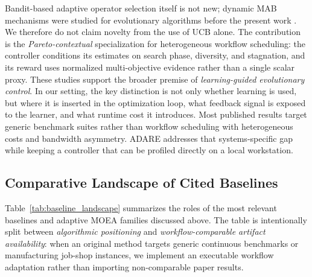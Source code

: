 \documentclass[preprint,12pt]{elsarticle}
\begin{document}
Bandit-based adaptive operator selection itself is not new; dynamic MAB mechanisms were studied for evolutionary algorithms before the present work \cite{dacosta2008aos,fialho2010aos}. We therefore do not claim novelty from the use of UCB alone. The contribution is the \emph{Pareto-contextual} specialization for heterogeneous workflow scheduling: the controller conditions its estimates on search phase, diversity, and stagnation, and its reward uses normalized multi-objective evidence rather than a single scalar proxy. These studies support the broader premise of \emph{learning-guided evolutionary control}. In our setting, the key distinction is not only whether learning is used, but where it is inserted in the optimization loop, what feedback signal is exposed to the learner, and what runtime cost it introduces. Most published results target generic benchmark suites rather than workflow scheduling with heterogeneous costs and bandwidth asymmetry. ADARE addresses that systems-specific gap while keeping a controller that can be profiled directly on a local workstation.

\subsection{Comparative Landscape of Cited Baselines}
Table~\ref{tab:baseline_landscape} summarizes the roles of the most relevant baselines and adaptive MOEA families discussed above. The table is intentionally split between \emph{algorithmic positioning} and \emph{workflow-comparable artifact availability}: when an original method targets generic continuous benchmarks or manufacturing job-shop instances, we implement an executable workflow adaptation rather than importing non-comparable paper results.
\end{document}
